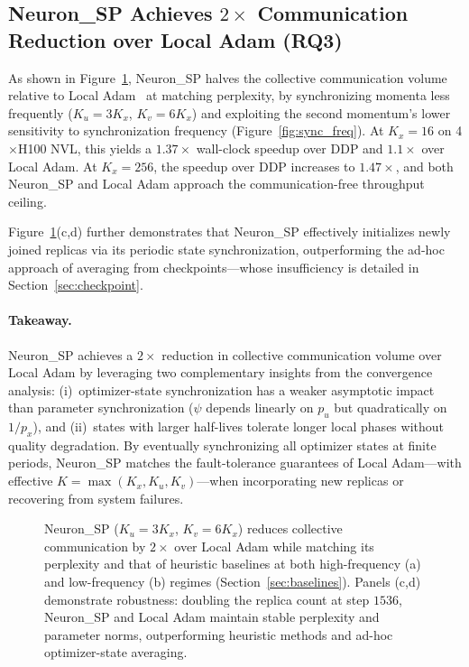 \documentclass{article}
\begin{document}
\subsection{Neuron\_SP Achieves $2\times$ Communication Reduction over
Local Adam (RQ3)}
\label{sec:rq3}

As shown in Figure~\ref{fig:comms}, Neuron\_SP halves the collective
communication volume relative to Local
Adam~\citep{cheng2025convergence} at matching perplexity, by
synchronizing momenta less frequently ($K_u = 3K_x$, $K_v = 6K_x$)
and exploiting the second momentum's lower sensitivity to
synchronization frequency (Figure~\ref{fig:sync_freq}). At $K_x = 16$
on 4$\times$H100 NVL, this yields a $1.37\times$ wall-clock speedup
over DDP and $1.1\times$ over Local Adam. At $K_x = 256$, the speedup
over DDP increases to $1.47\times$, and both Neuron\_SP and Local Adam
approach the communication-free throughput ceiling.

Figure~\ref{fig:comms}(c,d) further demonstrates that Neuron\_SP
effectively initializes newly joined replicas via its periodic
state synchronization, outperforming the ad-hoc approach of averaging
from checkpoints---whose insufficiency is detailed in
Section~\ref{sec:checkpoint}.

\paragraph{Takeaway.}
Neuron\_SP achieves a $2\times$ reduction in collective communication
volume over Local Adam by leveraging two complementary insights from the
convergence analysis: (i)~optimizer-state synchronization has a weaker
asymptotic impact than parameter synchronization ($\psi$ depends linearly
on $p_u$ but quadratically on $1/p_x$), and (ii)~states with larger
half-lives tolerate longer local phases without quality degradation.
By eventually synchronizing all optimizer states at finite periods,
Neuron\_SP matches the fault-tolerance guarantees of Local Adam---with
effective $K = \max(K_x, K_u, K_v)$---when incorporating new replicas or
recovering from system failures.

\begin{figure}[t]
\centering
\caption{Neuron\_SP ($K_u = 3K_x$, $K_v = 6K_x$) reduces collective
communication by $2\times$ over Local Adam while matching its perplexity
and that of heuristic baselines at both high-frequency (a) and
low-frequency (b) regimes (Section~\ref{sec:baselines}). Panels (c,d)
demonstrate robustness: doubling the replica count at step $1536$,
Neuron\_SP and Local Adam maintain stable perplexity and parameter norms,
outperforming heuristic methods and ad-hoc optimizer-state averaging.}
\label{fig:comms}
\end{figure}
\end{document}
